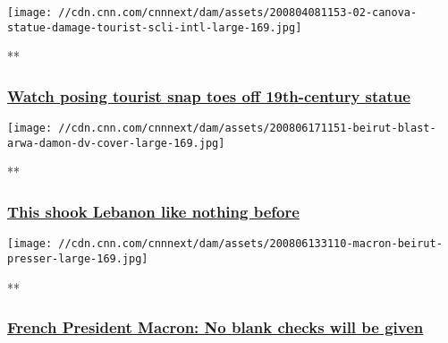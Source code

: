 \href{/videos/arts/2020/08/04/tourist-breaks-statue-italy-orig-mrg.cnn/video/playlists/around-the-world/}{}

\texttt{[image: //cdn.cnn.com/cnnnext/dam/assets/200804081153-02-canova-statue-damage-tourist-scli-intl-large-169.jpg]}

**

\hypertarget{watch-posing-tourist-snap-toes-off-19th-century-statue}{%
\subsubsection{\texorpdfstring{\href{/videos/arts/2020/08/04/tourist-breaks-statue-italy-orig-mrg.cnn/video/playlists/around-the-world/}{Watch
posing tourist snap toes off 19th-century
statue}}{Watch posing tourist snap toes off 19th-century statue}}\label{watch-posing-tourist-snap-toes-off-19th-century-statue}}

\href{/videos/world/2020/08/06/beirut-explosion-arwa-damon-lon-orig.cnn/video/playlists/around-the-world/}{}

\texttt{[image: //cdn.cnn.com/cnnnext/dam/assets/200806171151-beirut-blast-arwa-damon-dv-cover-large-169.jpg]}

**

\hypertarget{this-shook-lebanon-like-nothing-before}{%
\subsubsection{\texorpdfstring{\href{/videos/world/2020/08/06/beirut-explosion-arwa-damon-lon-orig.cnn/video/playlists/around-the-world/}{This
shook Lebanon like nothing
before}}{This shook Lebanon like nothing before}}\label{this-shook-lebanon-like-nothing-before}}

\href{/videos/world/2020/08/06/emmanuel-macron-lebanon-leaders-blank-check-sot-vpx.afptv/video/playlists/around-the-world/}{}

\texttt{[image: //cdn.cnn.com/cnnnext/dam/assets/200806133110-macron-beirut-presser-large-169.jpg]}

**

\hypertarget{french-president-macron-no-blank-checks-will-be-given}{%
\subsubsection{\texorpdfstring{\href{/videos/world/2020/08/06/emmanuel-macron-lebanon-leaders-blank-check-sot-vpx.afptv/video/playlists/around-the-world/}{French
President Macron: No blank checks will be
given}}{French President Macron: No blank checks will be given}}\label{french-president-macron-no-blank-checks-will-be-given}}

